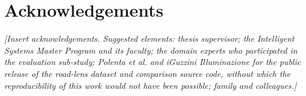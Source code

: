 \chapter*{Acknowledgements}

\textit{[Insert acknowledgements. Suggested elements: thesis supervisor; the
Intelligent Systems Master Program and its faculty; the domain experts who
participated in the evaluation sub-study; Polenta et al. and iGuzzini
Illuminazione for the public release of the road-lens dataset and comparison
source code, without which the reproducibility of this work would not have
been possible; family and colleagues.]}
